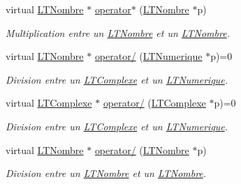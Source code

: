 \begin{DoxyCompactItemize}
virtual \hyperlink{class_l_t_nombre}{L\+T\+Nombre} $\ast$ \hyperlink{class_l_t_nombre_a0007e6bb8f949460f8db1c8bbee457f5}{operator$\ast$} (\hyperlink{class_l_t_nombre}{L\+T\+Nombre} $\ast$p)
\begin{DoxyCompactList}\small\item\em Multiplication entre un \hyperlink{class_l_t_nombre}{L\+T\+Nombre} et un \hyperlink{class_l_t_nombre}{L\+T\+Nombre}. \end{DoxyCompactList}\item 
virtual \hyperlink{class_l_t_nombre}{L\+T\+Nombre} $\ast$ \hyperlink{class_l_t_nombre_abfb3b0f925a6706222173779cf3f762d}{operator/} (\hyperlink{class_l_t_numerique}{L\+T\+Numerique} $\ast$p)=0
\begin{DoxyCompactList}\small\item\em Division entre un \hyperlink{class_l_t_complexe}{L\+T\+Complexe} et un \hyperlink{class_l_t_numerique}{L\+T\+Numerique}. \end{DoxyCompactList}\item 
virtual \hyperlink{class_l_t_complexe}{L\+T\+Complexe} $\ast$ \hyperlink{class_l_t_nombre_ae7e0f2dba7aba0f3251e18c5cfc60b5a}{operator/} (\hyperlink{class_l_t_complexe}{L\+T\+Complexe} $\ast$p)=0
\begin{DoxyCompactList}\small\item\em Division entre un \hyperlink{class_l_t_complexe}{L\+T\+Complexe} et un \hyperlink{class_l_t_numerique}{L\+T\+Numerique}. \end{DoxyCompactList}\item 
virtual \hyperlink{class_l_t_nombre}{L\+T\+Nombre} $\ast$ \hyperlink{class_l_t_nombre_a56b380eddb73e8c09dee99b52aadaee2}{operator/} (\hyperlink{class_l_t_nombre}{L\+T\+Nombre} $\ast$p)
\begin{DoxyCompactList}\small\item\em Division entre un \hyperlink{class_l_t_nombre}{L\+T\+Nombre} et un \hyperlink{class_l_t_nombre}{L\+T\+Nombre}. \end{DoxyCompactList}\end{DoxyCompactItemize}
